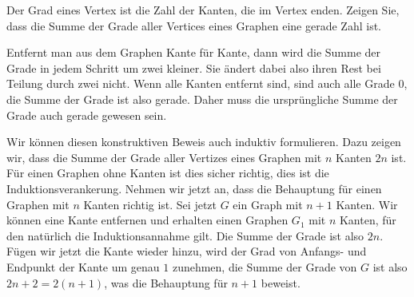 Der Grad eines Vertex ist die Zahl der Kanten, die im Vertex enden.
Zeigen Sie, dass die Summe der Grade aller Vertices eines Graphen
eine gerade Zahl ist.


\begin{loesung}
Entfernt man aus dem Graphen Kante für Kante, dann wird die
Summe der Grade in jedem Schritt um zwei kleiner. Sie ändert
dabei also ihren Rest bei Teilung durch zwei nicht. Wenn alle
Kanten entfernt sind, sind auch alle Grade 0, die Summe der
Grade ist also gerade. Daher muss die ursprüngliche Summe der
Grade auch gerade gewesen sein.

Wir können diesen konstruktiven Beweis auch induktiv formulieren.
Dazu zeigen wir, dass die Summe der Grade aller Vertizes eines Graphen
mit $n$ Kanten $2n$ ist. Für einen Graphen ohne Kanten ist dies
sicher richtig, dies ist die Induktionsverankerung. Nehmen wir
jetzt an, dass die Behauptung für einen Graphen mit $n$ Kanten
richtig ist. Sei jetzt $G$ ein Graph mit $n+1$ Kanten. Wir können
eine Kante entfernen und erhalten einen Graphen $G_1$ mit $n$
Kanten, für den natürlich die Induktionsannahme gilt. Die Summe
der Grade ist also $2n$. Fügen wir jetzt die Kante wieder hinzu,
wird der Grad von Anfangs- und Endpunkt der Kante um genau $1$
zunehmen, die Summe der Grade von $G$ ist also $2n+2=2(n+1)$,
was die Behauptung für $n+1$ beweist.
\end{loesung}

